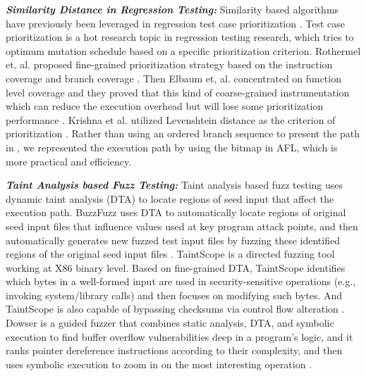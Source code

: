 \documentclass{cta-author}
\begin{document}
\noindent\textit{\textbf{Similarity Distance in Regression Testing:}}
Similarity based algorithms have previously been leveraged in regression test case prioritization \cite{wang2015similarity, zhang2012simfuzz, jones2003test}. Test case prioritization is a hot research topic in regression testing research, which tries to optimum mutation schedule based on a specific prioritization criterion. Rothermel et, al. proposed fine-grained prioritization strategy based on the instruction coverage and branch coverage \cite{rothermel2001prioritizing}. Then Elbaum et, al. concentrated on function level coverage and they proved that this kind of coarse-grained instrumentation which can reduce the execution overhead but will lose some prioritization performance \cite{elbaum2001incorporating}. Krishna et al. utilized Levenshtein distance as the criterion of prioritization \cite{krishnamoorthi2009factor}. Rather than using an ordered branch sequence to present the path in \cite{wang2015similarity}, we represented the execution path by using the bitmap in AFL, which is more practical and efficiency.

\noindent\textit{\textbf{Taint Analysis based Fuzz Testing:}}
Taint analysis based fuzz testing uses dynamic taint analysis (DTA) to locate regions of seed input that affect the execution path. BuzzFuzz uses DTA to automatically locate regions of original seed input files that influence values used at key program attack points, and then automatically generates new fuzzed test input files by fuzzing these identified regions of the original seed input files \cite{ganesh2009taint}. TaintScope is a directed fuzzing tool working at X86 binary level. Based on fine-grained DTA, TaintScope identifies which bytes in a well-formed input are used in security-sensitive operations (e.g., invoking system/library calls) and then focuses on modifying such bytes. And TaintScope is also capable of bypassing checksums via control flow alteration \cite{wang2010taintscope}. Dowser is a guided fuzzer that combines static analysis, DTA, and symbolic execution to find buffer overflow vulnerabilities deep in a program’s logic, and it ranks pointer dereference instructions according to their complexity, and then uses symbolic execution to zoom in on the most interesting operation \cite{haller2013dowsing}.
\end{document}

